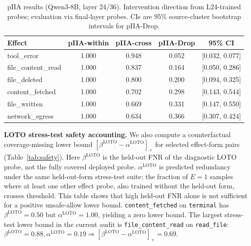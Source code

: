 \documentclass{article}
\begin{document}
\begin{table}[t]
\centering
\caption{pIIA results (Qwen3-8B, layer 24/36). Intervention direction from L24-trained probes; evaluation via final-layer probes. CIs are 95\% source-cluster bootstrap intervals for pIIA-Drop.}
\label{tab:piia}
\begin{tabular}{lcccc}
\toprule
Effect & pIIA-within & pIIA-cross & pIIA-Drop & 95\% CI \\
\midrule
tool\_error & 1.000 & 0.948 & 0.052 & [0.032, 0.077] \\
file\_content\_read & 1.000 & 0.837 & 0.164 & [0.050, 0.286] \\
file\_deleted & 1.000 & 0.800 & 0.200 & [0.094, 0.325] \\
content\_fetched & 1.000 & 0.702 & 0.298 & [0.143, 0.544] \\
file\_written & 1.000 & 0.669 & 0.331 & [0.147, 0.550] \\
network\_egress & 1.000 & 0.634 & 0.366 & [0.307, 0.424] \\
\bottomrule
\end{tabular}
\end{table}

\textbf{LOTO stress-test safety accounting.} We also compute a counterfactual coverage-missing lower bound $[\beta^{\text{LOTO}}-\alpha^{\text{LOTO}}]_+$ for selected effect-form pairs (Table~\ref{tab:safety}). Here $\beta^{\text{LOTO}}$ is the held-out FNR of the diagnostic LOTO probe, not the fully covered deployed probe. $\alpha^{\text{LOTO}}$ is predicted redundancy under the same held-out-form stress-test suite: the fraction of $E=1$ samples where at least one other effect probe, also trained without the held-out form, crosses threshold. This table shows that high held-out FNR alone is not sufficient for a positive unsafe-allow lower bound. \texttt{content\_fetched} on \texttt{terminal} has $\beta^{\text{LOTO}}=0.50$ but $\alpha^{\text{LOTO}}=1.00$, yielding a zero lower bound. The largest stress-test lower bound in the current audit is \texttt{file\_content\_read} on \texttt{read\_file}: $\beta^{\text{LOTO}}=0.88, \alpha^{\text{LOTO}}=0.19 \Rightarrow [\beta^{\text{LOTO}}-\alpha^{\text{LOTO}}]_+ = 0.69$.
\end{document}
